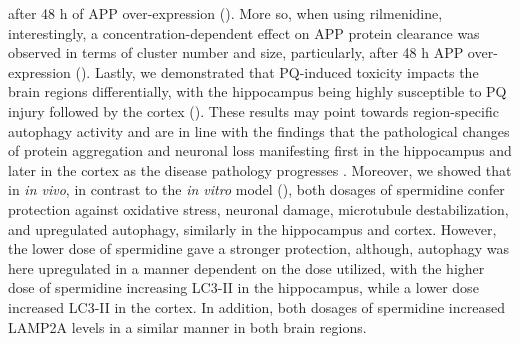 after 48 h of APP over-expression (). More so, when using rilmenidine, interestingly, a concentration-dependent effect on APP protein clearance was observed in terms of  cluster number and size, particularly, after 48 h APP over-expression (). Lastly, we demonstrated that PQ-induced toxicity impacts the brain regions differentially, with the hippocampus being highly susceptible to PQ injury followed by the cortex (). These results may point towards region-specific autophagy activity and are in line with the findings that the pathological changes of protein aggregation and neuronal loss manifesting first in the hippocampus and later in the cortex as the disease pathology progresses \citep{Braak2004,Braak1998,Braak1991,Braak2012}. Moreover, we showed that in \textit{in vivo}, in contrast to the \textit{in vitro} model (), both dosages of spermidine confer protection against oxidative stress, neuronal damage, microtubule destabilization, and upregulated autophagy, similarly in the hippocampus and cortex. However, the lower dose of spermidine gave a stronger protection, although, autophagy was here upregulated in a manner dependent on the dose utilized, with the higher dose of spermidine increasing LC3-II in the hippocampus, while a lower dose increased LC3-II in the cortex. In addition, both dosages of spermidine increased LAMP2A levels in a similar manner in both brain regions. 


